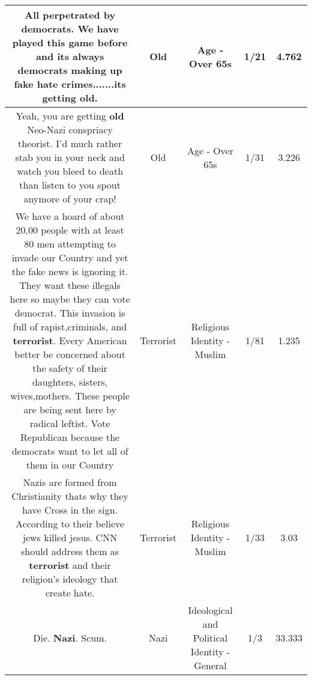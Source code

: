 \documentclass[11pt]{article}
\newlength\mylength
\begin{document}
\begin{center}
\begin{longtable}{|C{.65\mylength}|C{.30\mylength}|C{.12\mylength}|C{.12\mylength}|C{.12\mylength}|}
  \small All perpetrated by democrats. We have played this game before and its always democrats making up fake hate crimes.......its getting \textbf{old}.\normalsize   & Old & Age - Over 65s & 1/21 & 4.762 \\  \hline
  \small Yeah, you are getting \textbf{old} Neo-Nazi conspriacy theorist. I'd much rather stab you in your neck and watch you bleed to death than listen to you spout anymore of your crap!\normalsize   & Old & Age - Over 65s & 1/31 & 3.226 \\  \hline
  \small We have a hoard of about 20,00 people with at least 80 men attempting to invade our Country and yet the fake news is ignoring it. They want these illegals here so maybe they can vote democrat. This invasion is full of rapist,criminals, and \textbf{terrorist}. Every American better be concerned about the safety of their daughters, sisters, wives,mothers. These people are being sent here by radical leftist. Vote Republican because the democrats want to let all of them in our Country\normalsize   & Terrorist & Religious Identity - Muslim & 1/81 & 1.235 \\  \hline
  \small Nazis are formed from Christianity thats why they have  Cross in the sign. According to their believe jews killed jesus. CNN should address them as \textbf{terrorist} and their religion's ideology  that create  hate.\normalsize   & Terrorist & Religious Identity - Muslim & 1/33 & 3.03 \\  \hline
  \small Die. \textbf{Nazi}. Scum.\normalsize   & Nazi &  Ideological and Political Identity - General & 1/3 & 33.333 \\  \hline

\end{longtable}
\end{center}
\end{document}
